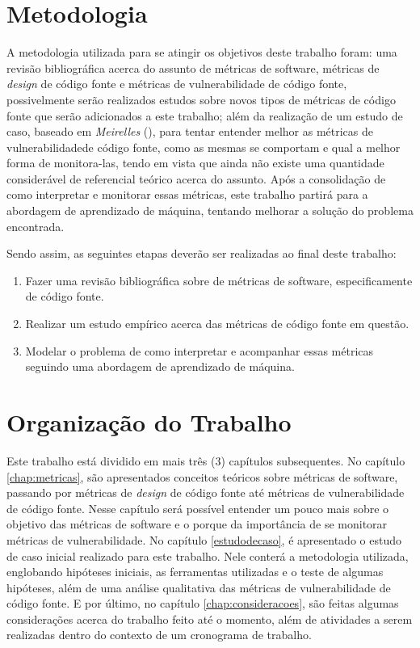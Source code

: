 \section{Metodologia}

A metodologia utilizada para se atingir os objetivos deste trabalho foram: uma
revisão bibliográfica acerca do assunto de métricas de software, métricas de
\textit{design} de código fonte e métricas de vulnerabilidade de código fonte,
possivelmente serão realizados estudos sobre novos tipos de métricas de código
fonte que serão adicionados a este trabalho; além da realização de um estudo de 
caso, baseado em \emph{Meirelles} (\citeyear{meirelles2013}), para tentar entender 
melhor as métricas de vulnerabilidadede código fonte, como as mesmas se comportam 
e qual a melhor forma de monitora-las, tendo em vista que ainda não existe uma
quantidade considerável de referencial teórico acerca do assunto. Após a
consolidação de como interpretar e monitorar essas métricas, este trabalho
partirá para a abordagem de aprendizado de máquina, tentando melhorar a solução
do problema encontrada.

Sendo assim, as seguintes etapas deverão ser realizadas ao final deste trabalho:

\begin{enumerate}
  \item Fazer uma revisão bibliográfica sobre de métricas de software,
    especificamente de código fonte.
  \item Realizar um estudo empírico acerca das métricas de código fonte em
    questão.
  \item Modelar o problema de como interpretar e acompanhar essas métricas
    seguindo uma abordagem de aprendizado de máquina.
\end{enumerate}


\section{Organização do Trabalho}

Este trabalho está dividido em mais três (3) capítulos subsequentes. No capítulo
\ref{chap:metricas}, são apresentados conceitos teóricos sobre métricas de
software, passando por métricas de \textit{design} de código fonte até métricas de 
vulnerabilidade de código fonte. Nesse capítulo será possível entender um pouco mais 
sobre o objetivo das métricas de software e o porque da importância de se monitorar
métricas de vulnerabilidade. No capítulo \ref{estudodecaso}, é apresentado o
estudo de caso inicial realizado para este trabalho. Nele conterá a metodologia
utilizada, englobando hipóteses iniciais, as ferramentas utilizadas e o teste de
algumas hipóteses, além de uma análise qualitativa das métricas de
vulnerabilidade de código fonte. E por último, no capítulo
\ref{chap:consideracoes}, são feitas algumas considerações acerca do trabalho
feito até o momento, além de atividades a serem realizadas dentro do contexto de
um cronograma de trabalho.

